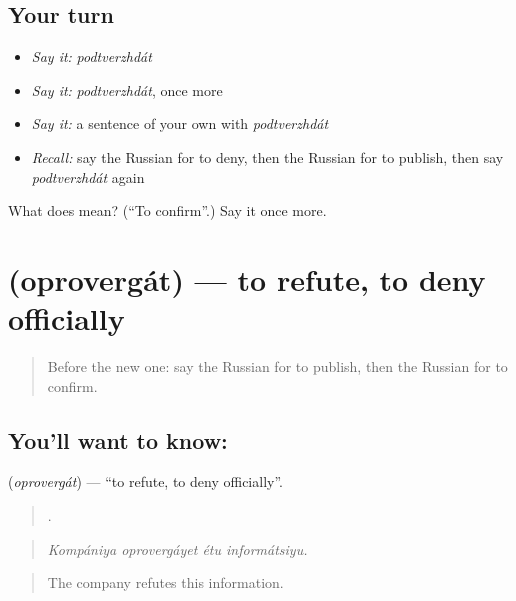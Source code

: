 \subsection*{Your turn}
\begin{itemize}
\raggedright
  \item \emph{Say it:} \emph{podtverzhdát}
  \item \emph{Say it:} \emph{podtverzhdát}, once more
  \item \emph{Say it:} a sentence of your own with \emph{podtverzhdát}
  \item \emph{Recall:} say the Russian for to deny, then the Russian for to publish, then say \emph{podtverzhdát} again
\end{itemize}

\begin{tcolorbox}[breakable,colback=teal!4,colframe=teal!35!black,title={Before you move on}]
What does  mean? (\textquotedblleft{}To confirm\textquotedblright{}.) Say it once more.
\end{tcolorbox}
\section[\texorpdfstring{\ru{опровергать} (oprovergát)}{опровергать (oprovergát)}]{ (oprovergát) — to refute, to deny officially}

\label{lesson:RU-C280-oprovergat}



\begin{quote}
Before the new one: say the Russian for to publish, then the Russian for to confirm.
\end{quote}

\subsection*{You'll want to know: }
\textbf{} (\emph{oprovergát}) — \textquotedblleft{}to refute, to deny officially\textquotedblright{}.

\begin{quote}
   .
\end{quote}

\begin{quote}
\emph{Kompániya oprovergáyet étu informátsiyu.}
\end{quote}

\begin{quote}
The company refutes this information.
\end{quote}

